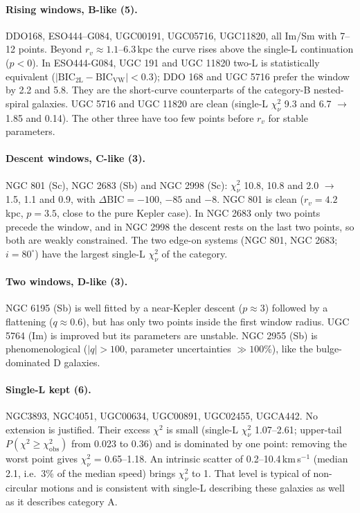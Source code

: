 \documentclass[10pt]{article}
\begin{document}
\paragraph{Rising windows, B-like (5).} DDO168, ESO444--G084, UGC00191, UGC05716, UGC11820, all Im/Sm with 7--12 points. Beyond $r_v\approx1.1$--6.3\,kpc the curve rises above the single-L continuation ($p<0$). In ESO444-G084, UGC 191 and UGC 11820 two-L is statistically equivalent ($|\mathrm{BIC_{2L}-BIC_{VW}}|<0.3$); DDO 168 and UGC 5716 prefer the window by 2.2 and 5.8. They are the short-curve counterparts of the category-B nested-spiral galaxies. UGC 5716 and UGC 11820 are clean (single-L $\chi^2_\nu$ 9.3 and 6.7 $\to$ 1.85 and 0.14). The other three have too few points before $r_v$ for stable parameters.

\paragraph{Descent windows, C-like (3).} NGC 801 (Sc), NGC 2683 (Sb) and NGC 2998 (Sc): $\chi^2_\nu$ 10.8, 10.8 and 2.0 $\to$ 1.5, 1.1 and 0.9, with $\Delta\mathrm{BIC}=-100$, $-85$ and $-8$. NGC 801 is clean ($r_v=4.2$\,kpc, $p=3.5$, close to the pure Kepler case). In NGC 2683 only two points precede the window, and in NGC 2998 the descent rests on the last two points, so both are weakly constrained. The two edge-on systems (NGC 801, NGC 2683; $i=80^\circ$) have the largest single-L $\chi^2_\nu$ of the category.

\paragraph{Two windows, D-like (3).} NGC 6195 (Sb) is well fitted by a near-Kepler descent ($p\approx3$) followed by a flattening ($q\approx0.6$), but has only two points inside the first window radius. UGC 5764 (Im) is improved but its parameters are unstable. NGC 2955 (Sb) is phenomenological ($|q|>100$, parameter uncertainties $\gg100$\%), like the bulge-dominated D galaxies.

\paragraph{Single-L kept (6).} NGC3893, NGC4051, UGC00634, UGC00891, UGC02455, UGCA442. No extension is justified. Their excess $\chi^2$ is small (single-L $\chi^2_\nu$ 1.07--2.61; upper-tail $P(\chi^2\ge\chi^2_\mathrm{obs})$ from 0.023 to 0.36) and is dominated by one point: removing the worst point gives $\chi^2_\nu$ = 0.65--1.18. An intrinsic scatter of 0.2--10.4\,km\,s$^{-1}$ (median 2.1, i.e.\ 3\% of the median speed) brings $\chi^2_\nu$ to 1. That level is typical of non-circular motions and is consistent with single-L describing these galaxies as well as it describes category A.
\end{document}
